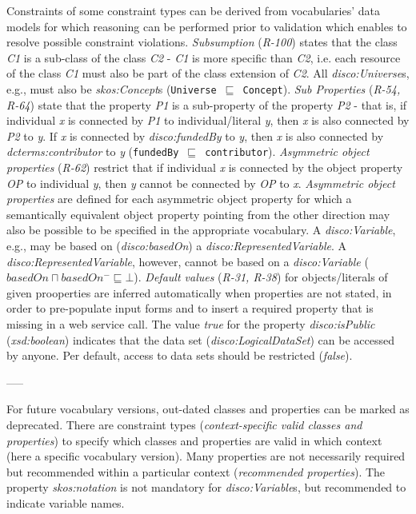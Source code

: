 \documentclass{llncs}
\newcommand{\ms}[1]{\texttt{#1}}
\begin{document}
{{Constraints of some constraint types can be derived from vocabularies' data models for which reasoning can be performed prior to validation which enables to resolve possible constraint violations.
\emph{Subsumption} (\emph{R-100}) states that the class \emph{C1} is a sub-class of the class \emph{C2} - \emph{C1} is more specific than \emph{C2}, 
i.e. each resource of the class \emph{C1} must also be part of the class extension of \emph{C2}. 
All \emph{disco:Universe}s, e.g., must also be \emph{skos:Concept}s (\ms{Universe $\sqsubseteq$ Concept}).
\emph{Sub Properties} (\emph{R-54, R-64}) state that the property \emph{P1} is a sub-property of the property \emph{P2} - that is, if individual \emph{x} is connected by \emph{P1} to individual/literal \emph{y}, then \emph{x} is also connected by \emph{P2} to \emph{y}. 
If \emph{x} is connected by \emph{disco:fundedBy} to \emph{y}, then \emph{x} is also connected by \emph{dcterms:contributor} to \emph{y} (\ms{fundedBy $\sqsubseteq$ contributor}).
\emph{Asymmetric object properties} (\emph{R-62}) restrict that if individual \emph{x} is connected by the object property \emph{OP} to individual \emph{y}, then \emph{y} cannot be connected by \emph{OP} to \emph{x}. 
\emph{Asymmetric object properties} are defined for each asymmetric object property for which a semantically equivalent object property pointing from the other direction may also be possible to be specified in the appropriate vocabulary.
A \emph{disco:Variable}, e.g., may be based on (\emph{disco:basedOn}) a \emph{disco:RepresentedVariable}.
A \emph{disco:RepresentedVariable}, however, cannot be based on a \emph{disco:Variable} (\ms{$basedOn \sqcap basedOn^{-} \sqsubseteq \bot$}).
\emph{Default values} (\emph{R-31, R-38}) for objects/literals of given prooperties are inferred automatically when properties are not stated, in order to pre-populate input forms and to insert a required property that is missing in a web service call.
The value \emph{true} for the property {\em disco:isPublic} ({\em xsd:boolean}) indicates that the data set ({\em disco:LogicalDataSet}) can be accessed by anyone.
Per default, access to data sets should be restricted (\emph{false}).

-----

For future vocabulary versions, out-dated classes and properties can be marked as deprecated.
There are constraint types (\emph{context-specific valid classes and properties}) to specify which classes and properties are valid in which context (here a specific vocabulary version).
Many properties are not necessarily required but recommended within a particular context (\emph{recommended properties}).
The property {\em skos:notation} is not mandatory for {\em disco:Variable}s, but recommended to indicate variable names.

}}
\end{document}
